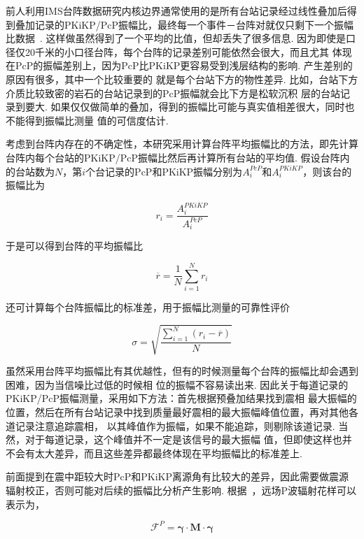前人利用IMS台阵数据研究内核边界通常使用的是所有台站记录经过线性叠加后得到叠加记录的PKiKP/PcP振幅比，最终每一个事件－台阵对就仅只剩下一个振幅比数据~\citep{Koper2004a}. 这样做虽然得到了一个平均的比值，但却丢失了很多信息. 因为即使是口径仅20千米的小口径台阵，每个台阵的记录差别可能依然会很大，而且尤其
体现在PcP的振幅差别上，因为PcP比PKiKP更容易受到浅层结构的影响. 产生差别的原因有很多，其中一个比较重要的
就是每个台站下方的物性差异. 比如，台站下方介质比较致密的岩石的台站记录到的PcP振幅就会比下方是松软沉积
层的台站记录到要大. 如果仅仅做简单的叠加，得到的振幅比可能与真实值相差很大，同时也不能得到振幅比测量
值的可信度估计. 

考虑到台阵内存在的不确定性，本研究采用计算台阵平均振幅比的方法，即先计算台阵内每个台站的PKiKP/PcP振幅比然后再计算所有台站的平均值. 假设台阵内的台站数为$N$，第$i$个台记录的PcP和PKiKP振幅分别为$A_i^{PcP}$和$A_i^{PKiKP}$，则该台的振幅比为

\begin{equation}
r_i = \frac{A_i^{PKiKP}}{A_i^{PcP}}
\end{equation}

于是可以得到台阵的平均振幅比

\begin{equation}
\overline{r} = \frac{1}{N} \sum_{i=1}^{N} r_i
\end{equation}

还可计算每个台阵振幅比的标准差，用于振幅比测量的可靠性评价

\begin{equation}
\sigma = \sqrt{\frac{\sum_{i=1}^{N} (r_i - \overline{r} )}{N}}
\end{equation}

虽然采用台阵平均振幅比有其优越性，但有的时候测量每个台阵的振幅比却会遇到困难，因为当信噪比过低的时候相
位的振幅不容易读出来. 因此关于每道记录的PKiKP/PcP振幅测量，采用如下方法：首先根据预叠加结果找到震相
最大振幅的位置，然后在所有台站记录中找到质量最好震相的最大振幅峰值位置，再对其他各道记录注意追踪震相，
以其峰值作为振幅，如果不能追踪，则剔除该道记录. 当然，对于每道记录，这个峰值并不一定是该信号的最大振幅
值，但即使这样也并不会有太大差异，而且这些差异都最终体现在平均振幅比的标准差上. 

前面提到在震中距较大时PcP和PKiKP离源角有比较大的差异，因此需要做震源辐射校正，否则可能对后续的振幅比分析产生影响. 根据~\citep{Aki2002a}，远场P波辐射花样可以表示为，

\begin{equation}
\mathcal{F}^P = \bm{\gamma} \cdot \bm{M} \cdot \bm{\gamma}
\end{equation}

